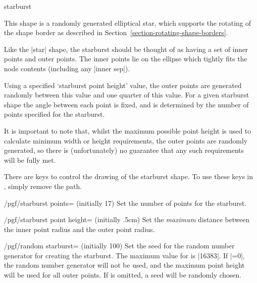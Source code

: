\begin{shape}{starburst}

	This shape is a randomly generated elliptical star,
	which supports the rotating of the shape border as described in
	Section~\ref{section-rotating-shape-borders}.
\begin{codeexample}[]
\end{codeexample}	
	Like the |star| shape, the starburst should be thought of as having a set
	of inner points and outer points. The inner points lie on the ellipse
	which tightly fits the node contents (including any |inner sep|).
	
	Using a specified `starburst point height' value, the outer points
	are generated randomly between this value and one quarter of this
	value. For a given starburst shape the angle between each point is
	fixed, and is determined by the number of points specified for
	the starburst.
	
	It is important to note that, whilst the maximum possible point
	height is used to calculate minimum width or height requirements,
	the outer points are randomly generated, so there is (unfortunately)
	no guarantee that any such requirements will be fully met.
	
\begin{codeexample}[]
\end{codeexample}

	There are \pgfname{} keys to control the drawing of the starburst
	shape. To use these keys in \tikzname,	simply remove the
		path.

	\begin{key}{/pgf/starburst points= (initially 17)}
		Set the number of points for the starburst.
	\end{key}
	\begin{key}{/pgf/starburst point height= (initially .5cm)}
      Set the \emph{maximum} distance between the inner point radius
      and the outer point radius.
	\end{key}
	
	\begin{key}{/pgf/random starburst= (initially 100)}
      Set the seed for the random number generator for creating the
      starburst.  The maximum value for  is |16383|.
      If |=0|, the random number generator will not be
      used, and the maximum point height will be used for all outer
      points. If  is omitted, a seed will be randomly
      chosen.
	\end{key}
	

\end{shape}
